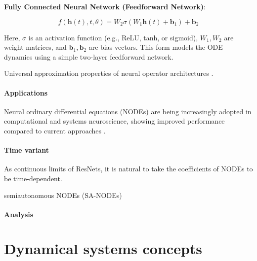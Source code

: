 \documentclass{article}
\theoremstyle{definition}
\theoremstyle{remark}
\newcounter{ct}
\begin{document}
\textbf{Fully Connected Neural Network (Feedforward Network)}:

\[
f(\mathbf{h}(t), t, \theta) = W_2 \sigma(W_1 \mathbf{h}(t) + \mathbf{b}_1) + \mathbf{b}_2
\]

Here, \( \sigma \) is an activation function (e.g., ReLU, tanh, or sigmoid), \( W_1, W_2 \) are weight matrices, and \( \mathbf{b}_1, \mathbf{b}_2 \) are bias vectors.
 This form models the ODE dynamics using a simple two-layer feedforward network.

Universal approximation properties of neural operator architectures \citep{lu2021learning, kissas2022learning, kovachki2021universal}.


\paragraph{Applications}
Neural ordinary differential equations (NODEs) are being increasingly adopted in computational and systems neuroscience, showing improved performance compared to current approaches \citep{kim2021inferring,geenjaar2023learning,sedler2023expressive,elgazzar2024universal,rubanova2019latent,coelho2024enhancing}.



\paragraph{Time variant}
As continuous limits of ResNets, it is natural to take the coefficients of NODEs to be time-dependent.

semiautonomous NODEs (SA-NODEs) \citep{li2024universal}


\paragraph{Analysis}
\citep{massaroli2020nodes}




\section{Dynamical systems concepts}
\end{document}
